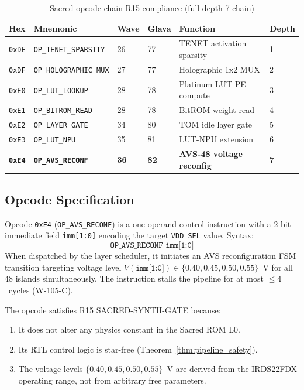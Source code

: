\begin{table}[ht]
\centering
\caption{Sacred opcode chain R15 compliance (full depth-7 chain)}
\label{tab:opcode_chain}
\begin{tabular}{llllll}
\hline
Hex & Mnemonic & Wave & Glava & Function & Depth \\
\hline
\texttt{0xDE} & \texttt{OP\_TENET\_SPARSITY}   & 26 & 77 & TENET activation sparsity & 1 \\
\texttt{0xDF} & \texttt{OP\_HOLOGRAPHIC\_MUX}  & 27 & 77 & Holographic 1x2 MUX       & 2 \\
\texttt{0xE0} & \texttt{OP\_LUT\_LOOKUP}        & 28 & 78 & Platinum LUT-PE compute   & 3 \\
\texttt{0xE1} & \texttt{OP\_BITROM\_READ}        & 28 & 78 & BitROM weight read        & 4 \\
\texttt{0xE2} & \texttt{OP\_LAYER\_GATE}         & 34 & 80 & TOM idle layer gate       & 5 \\
\texttt{0xE3} & \texttt{OP\_LUT\_NPU}            & 35 & 81 & LUT-NPU extension         & 6 \\
\texttt{\textbf{0xE4}} & \textbf{\texttt{OP\_AVS\_RECONF}} & \textbf{36} &
  \textbf{82} & \textbf{AVS-48 voltage reconfig} & \textbf{7} \\
\hline
\end{tabular}
\end{table}

\subsection{Opcode Specification}

\begin{definition}
\label{def:op_avs_reconf}
Opcode \texttt{0xE4} (\texttt{OP\_AVS\_RECONF}) is a one-operand
control instruction with a 2-bit immediate field \texttt{imm[1:0]}
encoding the target \texttt{VDD\_SEL} value.  Syntax:
\[
  \texttt{OP\_AVS\_RECONF imm[1:0]}
\]
When dispatched by the layer scheduler, it initiates an AVS
reconfiguration FSM transition targeting voltage level
$V(\texttt{imm[1:0]}) \in \{0.40, 0.45, 0.50, 0.55\}$~V
for all 48 islands simultaneously.  The instruction stalls the
pipeline for at most $\leq 4$~cycles (W-105-C).

The opcode satisfies R15 SACRED-SYNTH-GATE because:
\begin{enumerate}
  \item It does not alter any physics constant in the Sacred ROM L0.
  \item Its RTL control logic is star-free (Theorem~\ref{thm:pipeline_safety}).
  \item The voltage levels $\{0.40, 0.45, 0.50, 0.55\}$~V are derived
    from the IRDS22FDX operating range, not from arbitrary free parameters.
\end{enumerate}
\end{definition}

